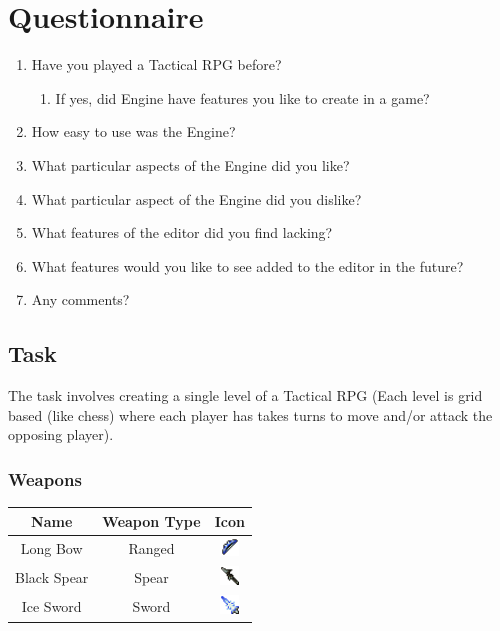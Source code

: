 
\section{Questionnaire}
\label{Questionnaire}
\begin{enumerate}
	\item Have you played a Tactical RPG before?
	\begin{enumerate}
		\item If yes, did Engine have features you like to create in a game?
	\end{enumerate}
	\item How easy to use was the Engine?
	\item What particular aspects of the Engine did you like? 
	\item What particular aspect of the Engine did you dislike? 
	
	\item What features of the editor did you find lacking?
	\item What features would you like to see added to the editor in the future?
	\item Any comments?
\end{enumerate}

\clearpage
\subsection{Task}

The task involves creating a single level of a Tactical RPG (Each level is grid based (like chess) where each player has takes turns to move and/or attack the opposing player).   

\subsubsection*{Weapons}
\begin{table}[h!]
	\begin{center}
		\begin{tabular}{c|c|c}
			Name        & Weapon Type & Icon \\\hline
			Long Bow    & Ranged      & \includegraphics[height=0.5cm]{figures/bow.png}     \\ 
			Black Spear & Spear       & \includegraphics[height=0.5cm]{figures/spear.png}     \\ 
			Ice Sword   & Sword       & \includegraphics[height=0.5cm]{figures/sword.png}     \\ 
		\end{tabular}
		\label{}
	\end{center}
\end{table}

